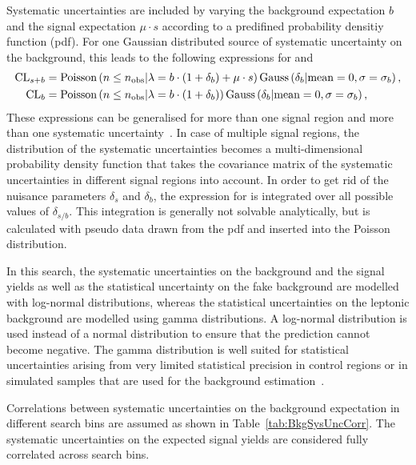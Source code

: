 Systematic uncertainties are included by varying the background expectation $b$ and the signal expectation $\mu\cdot s$ according to a predifined probability densitiy function (pdf).
For one Gaussian distributed source of systematic uncertainty on the background, this leads to the following expressions for \CLsb and \CLb
\begin{equation*}
\begin{split}
\text{CL}_{s+b} &= \text{Poisson}\left( n \leq n_{\text{obs}} |\lambda = b \cdot (1+\delta_b)+\mu\cdot s   \right) \text{Gauss}\left(\delta_b|\text{mean}=0, \sigma = \sigma_b\right),\\
\text{CL}_{b}  &= \text{Poisson}\left( n \leq n_{\text{obs}} |\lambda = b \cdot (1+\delta_b)   \right) \text{Gauss}\left(\delta_b|\text{mean}=0, \sigma = \sigma_b\right),
\end{split}
\end{equation*}
These expressions can be generalised for more than one signal region and more than one systematic uncertainty~\cite{bib:Ott_Thesis}.
In case of multiple signal regions, the distribution of the systematic uncertainties becomes a multi-dimensional probability density function that takes the covariance matrix of the systematic uncertainties in different signal regions into account.
In order to get rid of the nuisance parameters $\delta_s$ and $\delta_b$, the expression for \CLs is integrated over all possible values of $\delta_{s/b}$.
This integration is generally not solvable analytically, but is calculated with pseudo data drawn from the pdf and inserted into the Poisson distribution.

In this search, the systematic uncertainties on the background and the signal yields as well as the statistical uncertainty on the fake background are modelled with log-normal distributions, 
whereas the statistical uncertainties on the leptonic background are modelled using gamma distributions.
A log-normal distribution is used instead of a normal distribution to ensure that the prediction cannot become negative.
The gamma distribution is well suited for statistical uncertainties arising from very limited statistical precision in control regions or in simulated samples that are used for the background estimation~\cite{bib:CMS:Combine}.

Correlations between systematic uncertainties on the background expectation in different search bins are assumed as shown in Table~\ref{tab:BkgSysUncCorr}.
The systematic uncertainties on the expected signal yields are considered fully correlated across search bins.

